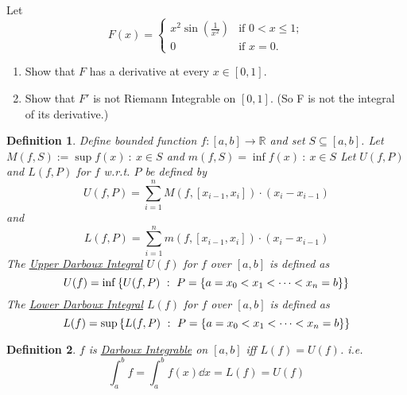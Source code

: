 \documentclass[]{article}
\newcommand{\R}{\mathbb{R}}
\newcommand{\st}{\ : \ }
\newtheorem{definition}{Definition}
\begin{document}
\newpage
\section{}
Let\[
    F(x) = \begin{cases}
        x^2 \sin(\frac{1}{x^2}) & \text{if } 0 < x \leq 1;\\
        0 & \text{if } x = 0.
    \end{cases}
\]
\begin{enumerate}
    \item Show that $F$ has a derivative at every $x\in [0,1]$.
    \item Show that $F'$ is not Riemann Integrable on $[0,1]$. (So F is not the integral of its derivative.)
\end{enumerate}

\begin{definition}\label{def:darboux_int}
    Define bounded function $f : [a,b] \to \R$ and set $S \subseteq [a,b]$.
    Let $M(f,S) := \sup{f(x) \st x \in S}$ and $m(f,S) = \inf{f(x) \st x \in S}$
    Let $U(f,P)$ and $L(f,P)$ for $f$ w.r.t. $P$ be defined by\[
        U(f,P) = \sum_{i=1}^{n} M(f,[x_{i-1},x_i]) \cdot (x_i - x_{i-1})
    \] and \[
        L(f,P) = \sum_{i=1}^{n} m(f,[x_{i-1},x_i]) \cdot (x_i - x_{i-1})
    \]
    The \underline{\emph{Upper Darboux Integral}} $U(f)$ for $f$ over $[a,b]$ is defined as \[
        U(f) = \inf\qty{U(f,P) \st P = \{a = x_0 < x_1 < \cdots < x_n = b\}}
    \]
    The \underline{\emph{Lower Darboux Integral}} $L(f)$ for $f$ over $[a,b]$ is defined as \[
        L(f) = \sup\qty{L(f,P) \st P = \{a = x_0 < x_1 < \cdots < x_n = b\}}
    \]
\end{definition}

\begin{definition}\label{def:darboux_integrable}
    $f$ is \emph{\underline{Darboux Integrable}} on $[a,b]$ iff $L(f) = U(f)$.
    i.e.\[
        \int_{a}^{b} f = \int_{a}^{b} f(x) \dd x = L(f) = U(f)
    \]
\end{definition}
\end{document}
